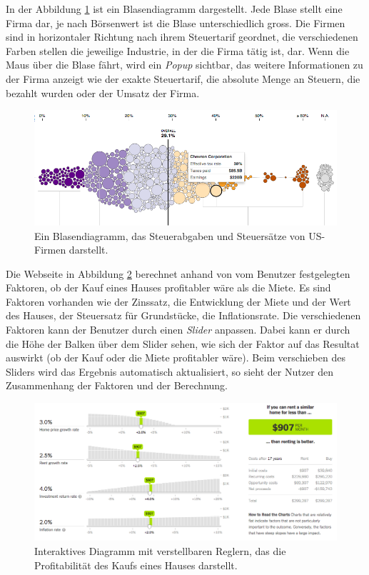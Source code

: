 In der Abbildung \ref{fig:nytimes-taxes} ist ein Blasendiagramm dargestellt. Jede Blase stellt eine Firma dar, je nach Börsenwert ist die Blase unterschiedlich gross. Die Firmen sind in horizontaler Richtung nach ihrem Steuertarif geordnet, die verschiedenen Farben stellen die jeweilige Industrie, in der die Firma tätig ist, dar. Wenn die Maus über die Blase fährt, wird ein \textit{Popup} sichtbar, das weitere Informationen zu der Firma anzeigt wie der exakte Steuertarif, die absolute Menge an Steuern, die bezahlt wurden oder der Umsatz der Firma.

\begin{figure}[!htbp]
	\centering
	\includegraphics[width=\linewidth]{images/nytimes-taxes-zugeschnitten}
	\caption[Blasendiagramm in The New York Times]{Ein Blasendiagramm, das Steuerabgaben und Steuersätze von US-Firmen darstellt. \cite{nytimes-taxes}}
	\label{fig:nytimes-taxes}
\end{figure}

Die Webseite in Abbildung \ref{fig:nytimes-realestate} berechnet anhand von vom Benutzer festgelegten Faktoren, ob der Kauf eines Hauses profitabler wäre als die Miete. Es sind Faktoren vorhanden wie der Zinssatz, die Entwicklung der Miete und der Wert des Hauses, der Steuersatz für Grundstücke, die Inflationsrate. Die verschiedenen Faktoren kann der Benutzer durch einen \textit{Slider} anpassen. Dabei kann er durch die Höhe der Balken über dem Slider sehen, wie sich der Faktor auf das Resultat auswirkt (ob der Kauf oder die Miete profitabler wäre). Beim verschieben des Sliders wird das Ergebnis automatisch aktualisiert, so sieht der Nutzer den Zusammenhang der Faktoren und der Berechnung.

\begin{figure}[!htbp]
	\centering
	\includegraphics[width=\linewidth]{images/nytimes-realestate-zugeschnitten}
	\caption[Interaktives Diagramm in The New York Times]{Interaktives Diagramm mit verstellbaren Reglern, das die Profitabilität des Kaufs eines Hauses darstellt. \cite{nytimes-realestate}}
	\label{fig:nytimes-realestate}
\end{figure}

